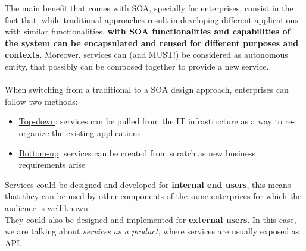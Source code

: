 \documentclass[10pt,a4paper]{article}
\begin{document}
The main benefit that comes with SOA, specially for enterprises, consist in the fact that, while traditional approaches result in developing different applications with similar functionalities, \textbf{with SOA functionalities and capabilities of the system can be encapsulated and reused for different purposes and contexts}. Moreover, services can (and MUST!) be considered as autonomous entity, that possibly can be composed together to provide a new service. \\ \\
When switching from a traditional to a SOA design approach, enterprises can follow two methods:
\begin{itemize}
	\item \uline{Top-down}: services can be pulled from the IT infrastructure as a way to re-organize the existing applications
	\item \uline{Bottom-up}: services can be created from scratch as new business requirements arise
\end{itemize}
Services could be designed and developed for \textbf{internal end users}, this means that they can be used by other components of the same enterprices for which the audience is well-known. \\
They could also be designed and implemented for \textbf{external users}. In this case, we are talking about \textit{services as a product}, where services are usually exposed as API.
\end{document}
